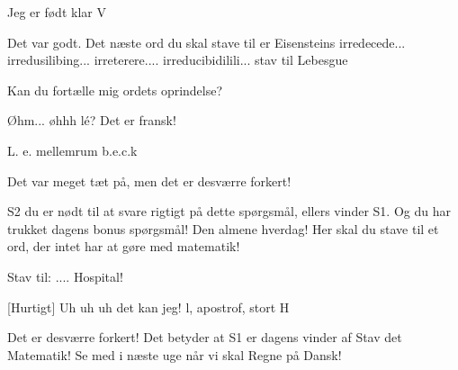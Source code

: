 \documentclass[a4paper,11pt]{article}
\begin{document}
\begin{sketch}
 Jeg er født klar V

 Det var godt. Det næste ord du skal stave til er Eisensteins irredecede... irredusilibing... irreterere.... irreducibidilili...  stav til Lebesgue 

 Kan du fortælle mig ordets oprindelse?

 Øhm...  øhhh lé?  Det er fransk!

 L. e. mellemrum b.e.c.k

 Det var meget tæt på, men det er desværre forkert!

 S2 du er nødt til at svare rigtigt på dette spørgsmål, ellers vinder S1.  Og du har trukket dagens bonus spørgsmål! Den almene hverdag! Her skal du stave til et ord, der intet har at gøre med matematik!

 Stav til: .... Hospital!


[Hurtigt] Uh uh uh det kan jeg! l, apostrof, stort H

 Det er desværre forkert! Det betyder at S1 er dagens vinder af Stav det Matematik! Se med i næste uge når vi skal Regne på Dansk!

\end{sketch}
\end{document}
